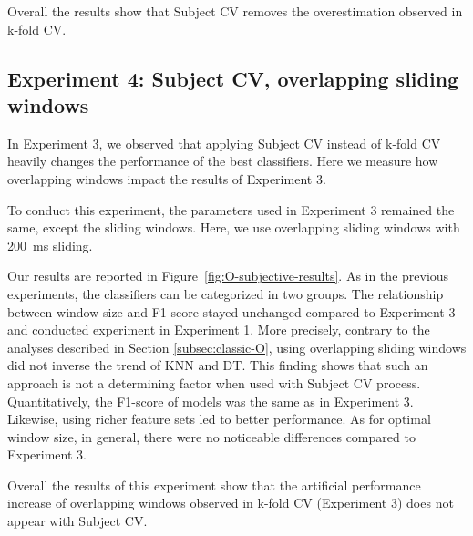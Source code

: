 \documentclass[sigconf]{acmart}
\newcommand{\TG}[1]{\color{red}\textbf{Note TG}: #1\color{black}}
\begin{document}
    Overall the results show that Subject CV removes the overestimation observed in k-fold CV.
  

\subsection{Experiment 4: Subject CV, overlapping sliding windows}

In Experiment  3, we observed that applying Subject CV instead of k-fold CV heavily changes the performance of the best classifiers. Here we measure how overlapping windows impact the results of Experiment  3. 

To conduct this experiment, the parameters used in Experiment  3 remained the same, except the sliding windows. Here, we use overlapping sliding windows with 200~ms sliding.

Our results are reported in Figure~\ref{fig:O-subjective-results}. As in the previous experiments, the classifiers can be categorized in two groups. The relationship between window size and F1-score stayed unchanged compared to Experiment  3 and conducted experiment in Experiment  1. More precisely, contrary to the analyses described in Section \ref{subsec:classic-O}, using overlapping sliding windows did not inverse the trend of KNN and DT. This finding shows that such an approach is not a determining factor when used with Subject CV process. Quantitatively, the F1-score of models was the same as in Experiment 3. Likewise, using richer feature sets led to better performance. As for optimal window size, in general, there were no noticeable differences compared to Experiment  3.   

Overall the results of this experiment show that the artificial performance increase of overlapping windows observed in k-fold CV (Experiment 3) does not appear with Subject CV.
\end{document}
